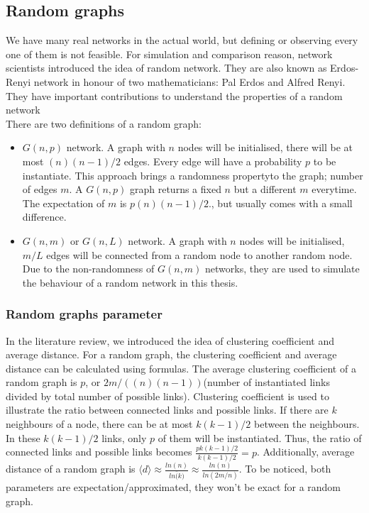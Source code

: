\documentclass[12pt]{article}
\begin{document}
\subsection{Random graphs}
We have many real networks in the actual world, but defining or observing every one of them is not feasible. For simulation and comparison reason, network scientists introduced the idea of random network. They are also known as Erdos-Renyi network in honour of two mathematicians: Pal Erdos and Alfred Renyi. They have important contributions to understand the properties of a random network\cite{barabási2016network}\\
\noindent
There are two definitions of a random graph:
\begin{itemize}
    \item $G(n,p)$ network. A graph with $n$ nodes will be initialised, there will be at most $(n)(n-1)/2$ edges. Every edge will have a probability $p$ to be instantiate. This approach brings a randomness propertyto the graph; number of edges $m$. A $G(n,p)$ graph returns a fixed $n$ but a different $m$ everytime. The expectation of $m$ is $p(n)(n-1)/2$., but usually comes with a small difference.
    \item $G(n,m)$ or $G(n,L)$ network. A graph with $n$ nodes will be initialised, $m/L$ edges will be connected from a random node to another random node. Due to the non-randomness of $G(n,m)$ networks, they are used to simulate the behaviour of a random network in this thesis.
\end{itemize}
\subsubsection{Random graphs parameter}
In the literature review, we introduced the idea of clustering coefficient and average distance. For a random graph, the clustering coefficient and average distance can be calculated using formulas.\cite{barabási2016network} The average clustering coefficient of a random graph is $p$, or $2m/((n)(n-1))$(number of instantiated links divided by total number of possible links). Clustering coefficient is used to illustrate the ratio between connected links and possible links. If there are $k$ neighbours of a node, there can be at most $k(k-1)/2$ between the neighbours. In these $k(k-1)/2$ links, only $p$ of them will be instantiated. Thus, the ratio of connected links and possible links becomes $\frac{pk(k-1)/2}{k(k-1)/2}=p$. Additionally, average distance of a random graph is $\langle d\rangle \approx \frac{ln(n)}{ln\bar (k)}\approx \frac{ln(n)}{ln(2m/n)}$. To be noticed, both parameters are expectation/approximated, they won't be exact for a random graph.
\end{document}
